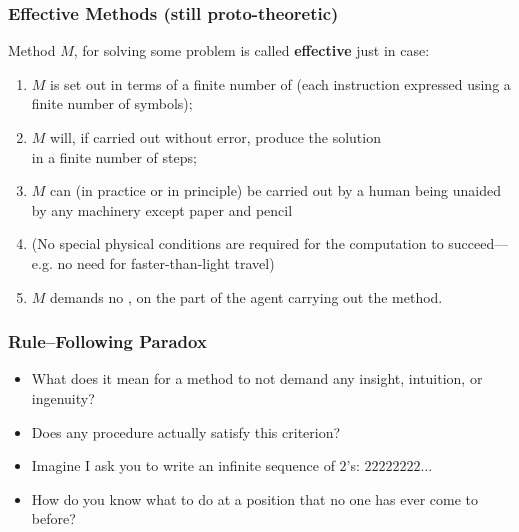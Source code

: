 \begin{frame}
\frametitle{Effective Methods (still proto-theoretic)}

Method $M$, for solving some problem is called \textbf{effective} just in case:

\begin{enumerate}[<+->]

\item $M$ is set out in terms of a \textcolor{highlightA}{finite number} of  (each instruction expressed using a \textcolor{highlightA}{finite number} of symbols);
\item $M$ will, if carried out \textcolor{OGlyallpink}{without error}, produce the solution \\ in a \textcolor{highlightA}{finite number} of steps;

\item $M$ can (in practice or in principle) be carried out by a human being unaided by any machinery except paper and pencil 
\item[] (No special physical conditions are required for the computation to succeed---e.g. no need for faster-than-light travel) 
\item $M$ demands no , on the part of the agent carrying out the method.


\end{enumerate}
\end{frame}

\begin{frame}
\frametitle{Rule--Following Paradox}

\begin{itemize}[<+->]

\item What does it mean for a method to not demand any insight, intuition, or ingenuity?

\item Does any procedure actually satisfy this criterion?

\item Imagine I ask you to write an infinite sequence of $2$'s: $22222222\dots$

\item[] How do you know what to do at a position that no one has ever come to before? 


\end{itemize}
\end{frame}


